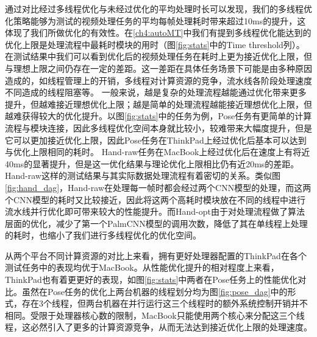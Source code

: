 通过对比经过多线程优化与未经过优化的平均处理时长可以发现，我们的多线程优化策略能够为测试的视频处理任务的平均每帧处理耗时带来超过10ms的提升，这体现了我们所做优化的有效性。在\ref{ch4:autoMT}中我们有提到多线程优化能达到的优化上限是处理流程中最耗时模块的用时（图\ref{fig:stats}中的Time threshold列）。在测试结果中我们可以看到优化后的视频处理任务在耗时上更为接近优化上限，但与理想上限之间仍存在一定的差距。这一差距在具体任务场景下可能是由多种原因造成的，如线程管理上的开销，多线程对计算资源的竞争，流水线各阶段处理速度不同造成的线程阻塞等。
一般来说，越是复杂的处理流程越能通过优化带来更多提升，但越难接近理想优化上限；越是简单的处理流程越能接近理想优化上限，但越难获得较大的优化提升。以图\ref{fig:stats}中的任务为例，Pose任务有更简单的计算流程与模块连接，因此多线程优化空间本身就比较小，较难带来大幅度提升，但是它可以更加接近优化上限，因此Pose任务在ThinkPad上经过优化后基本可以达到与优化上限相同的耗时。
Hand-raw任务在MacBook上经过优化后在速度上有将近40ms的显著提升，但是这一优化结果与理论优化上限相比仍有近20ms的差距。Hand-raw这样的测试结果与其实际数据处理流程有着密切的关系。类似图\ref{fig:hand_dag}，Hand-raw在处理每一帧时都会经过两个CNN模型的处理，而这两个CNN模型的耗时又比较接近，因此将这两个高耗时模块放在不同的线程中进行流水线并行优化即可带来较大的性能提升。而Hand-opt由于对处理流程做了算法层面的优化，减少了第一个PalmCNN模型的调用次数，降低了其在单线程上处理的耗时，也缩小了我们进行多线程优化的优化空间。\par

从两个平台不同计算资源的对比上来看，拥有更好处理器配置的ThinkPad在各个测试任务中的表现均优于MacBook。从性能优化提升的相对程度上来看，ThinkPad也有着更更好的表现，如图\ref{fig:stats}中两者在Pose任务上的性能优化对比。虽然在Pose任务的优化上两台机器的线程划分均为图\ref{fig:pose_dag}中的形式，存在3个线程，但两台机器在并行运行这三个线程时的额外系统控制开销并不相同。受限于处理器核心数的限制，MacBook只能使用两个核心来分配这三个线程，这必然引入了更多的计算资源竞争，从而无法达到接近优化上限的处理速度。

